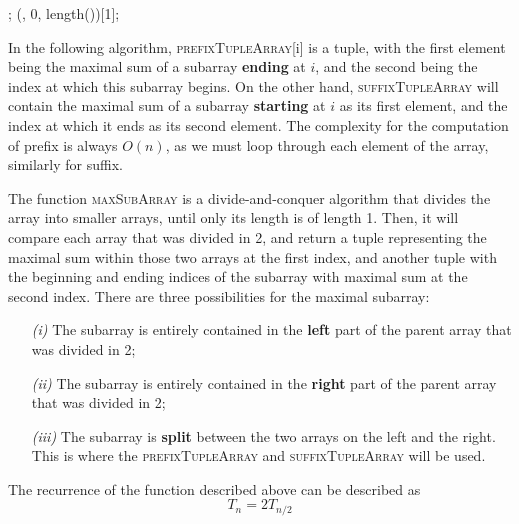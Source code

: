 \documentclass[12pt]{article}
\theoremstyle{definition}
\theoremstyle{remark}
\begin{document}
\begin{enumerate}
\begin{algorithm}
{  \Return \maxTuple;
  }
\BlankLine 
  \Return \maxsubarray (\arr, 0, length(\arr))[1];\\

\end{algorithm}
\DecMargin{1em}



In the following algorithm, \textsc{prefixTupleArray}[i] is a tuple, with the first element being the maximal sum of a subarray \textbf{ending} at $i$, and the second being the index at which this subarray begins. On the other hand, \textsc{suffixTupleArray} will contain the maximal sum of a subarray \textbf{starting} at $i$ as its first element, and the index at which it ends as its second element. The complexity for the computation of prefix is always $O(n)$, as we must loop through each element of the array, similarly for suffix. 

The function \textsc{maxSubArray} is a divide-and-conquer algorithm that divides the array into smaller arrays, until only its length is of length 1. Then, it will compare each array that was divided in 2, and return a tuple representing the maximal sum within those two arrays at the first index, and another tuple with the beginning and ending indices of the subarray with maximal sum at the second index. There are three possibilities for the maximal subarray: 
\begin{enumerate}
  \item[\it (i)] The subarray is entirely contained in the \textbf{left} part of the parent array that was divided in 2;
  \item[\it (ii)] The subarray is entirely contained in the \textbf{right} part of the parent array that was divided in 2;
  \item[\it (iii)] The subarray is \textbf{split} between the two arrays on the left and the right. This is where the  \textsc{prefixTupleArray} and \textsc{suffixTupleArray} will be used. 
\end{enumerate}
The recurrence of the function described above can be described as 
$$T_n = 2T_{n/2} $$

\end{enumerate}
\end{document}
